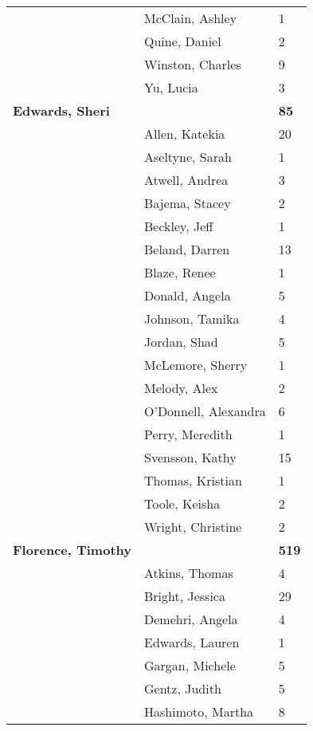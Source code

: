 \documentclass{article}\usepackage[]{graphicx}\usepackage[]{color}
\begin{document}
{\begin{longtable} { >{\raggedright}p{}|p{}p{}}
   \rowcolor[gray]{0.90} & McClain, Ashley & 1 \\ 
   \rowcolor[gray]{0.90} & Quine, Daniel & 2 \\ 
   \rowcolor[gray]{0.90} & Winston, Charles & 9 \\ 
   & Yu, Lucia & 3 \\ 
  \textbf{Edwards, Sheri} &  & \hspace{2cm}\textbf{85} \\ 
   & Allen, Katekia & 20 \\ 
   \rowcolor[gray]{0.90} & Aseltyne, Sarah & 1 \\ 
   \rowcolor[gray]{0.90} & Atwell, Andrea & 3 \\ 
   \rowcolor[gray]{0.90} & Bajema, Stacey & 2 \\ 
   & Beckley, Jeff & 1 \\ 
   & Beland, Darren & 13 \\ 
   & Blaze, Renee & 1 \\ 
   \rowcolor[gray]{0.90} & Donald, Angela & 5 \\ 
   \rowcolor[gray]{0.90} & Johnson, Tamika & 4 \\ 
   \rowcolor[gray]{0.90} & Jordan, Shad & 5 \\ 
   & McLemore, Sherry & 1 \\ 
   & Melody, Alex & 2 \\ 
   & O'Donnell, Alexandra & 6 \\ 
   \rowcolor[gray]{0.90} & Perry, Meredith & 1 \\ 
   \rowcolor[gray]{0.90} & Svensson, Kathy & 15 \\ 
   \rowcolor[gray]{0.90} & Thomas, Kristian & 1 \\ 
   & Toole, Keisha & 2 \\ 
   & Wright, Christine & 2 \\ 
  \textbf{Florence, Timothy} &  & \hspace{2cm}\textbf{519} \\ 
   \rowcolor[gray]{0.90} & Atkins, Thomas & 4 \\ 
   \rowcolor[gray]{0.90} & Bright, Jessica & 29 \\ 
   \rowcolor[gray]{0.90} & Demehri, Angela & 4 \\ 
   & Edwards, Lauren & 1 \\ 
   & Gargan, Michele & 5 \\ 
   & Gentz, Judith & 5 \\ 
   \rowcolor[gray]{0.90} & Hashimoto, Martha & 8 \\ 

\end{longtable}}
\end{document}
